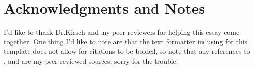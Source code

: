 \documentclass[journal]{IEEEtran}
\begin{document}

\section*{Acknowledgments and Notes}
I'd like to thank Dr.Kirsch and my peer reviewers for helping this essay come together. 
One thing I'd like to note are that the text formatter im using for this template does
not allow for citations to be bolded, so note that any references to \cite{stokes2021},
\cite{harvard} and \cite{ma2024} are my peer-reviewed sources, sorry for the trouble.



\printbibliography
\end{document}
